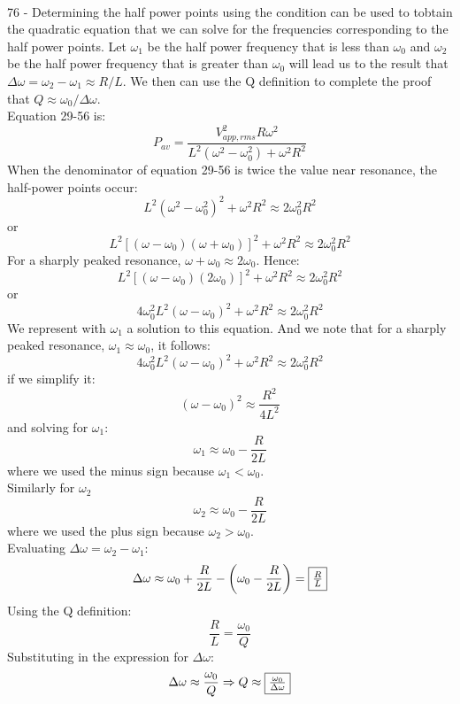 \documentclass{report}
\begin{document}
\paragraph{}
76 - Determining the half power points using the condition can be used to tobtain the quadratic equation that we can solve for the frequencies corresponding to the half power points. Let $\omega_1$ be the half power frequency that is less than $\omega_0$ and $\omega_2$ be the half power frequency that is greater than $\omega_0$ will lead us to the result that $\Delta \omega = \omega_2 - \omega_1 \approx R / L$. We then can use the Q definition to complete the proof that $Q \approx \omega_0 / \Delta \omega$.\\
Equation 29-56 is:
$$P_{av} = \frac{V_{app,rms}^2R\omega^2}{L^2(\omega^2 - \omega_0^2) + \omega^2R^2}$$
When the denominator of equation 29-56 is twice the value near resonance, the half-power points occur:
$$L^2(\omega^2 - \omega_0^2)^2 + \omega^2R^2 \approx 2 \omega_0^2 R^2$$
or
$$L^2[(\omega - \omega_0)(\omega + \omega_0)]^2 + \omega^2 R^2 \approx 2 \omega_0^2 R^2$$
For a sharply peaked resonance, $\omega + \omega_0 \approx 2 \omega_0$. Hence:
$$L^2[(\omega - \omega_0)(2 \omega_0)]^2 + \omega^2 R^2 \approx 2 \omega_0^2 R^2$$
or
$$4 \omega_0^2L^2(\omega - \omega_0)^2 + \omega^2 R^2 \approx 2 \omega_0^2 R^2$$
We represent with $\omega_1$ a solution to this equation. And we note that for a sharply peaked resonance, $\omega_1 \approx \omega_0$, it follows:
$$4 \omega_0^2L^2(\omega - \omega_0)^2 + \omega^2 R^2 \approx 2 \omega_0^2 R^2$$
if we simplify it:
$$(\omega - \omega_0)^2 \approx \frac{R^2}{4L^2}$$
and solving for $\omega_1$:
$$\omega_1 \approx \omega_0 - \frac{R}{2L}$$
where we used the minus sign because $\omega_1 < \omega_0$.\\
Similarly for $\omega_2$
$$\omega_2 \approx \omega_0 - \frac{R}{2L}$$
where we used the plus sign because $\omega_2 > \omega_0$.\\
Evaluating $\Delta \omega = \omega_2 - \omega_1$:
$$\Delta \omega \approx \omega_0 + \frac{R}{2L} - \left( \omega_0 - \frac{R}{2L} \right) = \fbox{$\frac{R}{L}$}$$
Using the Q definition:
$$\frac{R}{L} = \frac{\omega_0}{Q}$$
Substituting in the expression for $\Delta \omega$:
$$\Delta \omega \approx \frac{\omega_0}{Q} \Rightarrow Q \approx \fbox{$\frac{\omega_0}{\Delta \omega}$}$$
\end{document}
